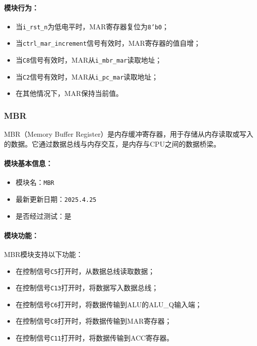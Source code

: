 \documentclass[lang=cn,a4paper,newtx]{elegantpaper}
\begin{document}
\paragraph{模块行为：}
\begin{itemize}
  \item 当\texttt{i\_rst\_n}为低电平时，MAR寄存器复位为\texttt{8'b0}；
  \item 当\texttt{ctrl\_mar\_increment}信号有效时，MAR寄存器的值自增；
  \item 当\texttt{C8}信号有效时，MAR从\texttt{i\_mbr\_mar}读取地址；
  \item 当\texttt{C2}信号有效时，MAR从\texttt{i\_pc\_mar}读取地址；
  \item 在其他情况下，MAR保持当前值。
\end{itemize}
\subsubsection{MBR}
MBR（Memory Buffer Register）是内存缓冲寄存器，用于存储从内存读取或写入的数据。它通过数据总线与内存交互，是内存与CPU之间的数据桥梁。

\paragraph{模块基本信息：}
\begin{itemize}
  \item 模块名：\texttt{MBR}
  \item 最新更新日期：\texttt{2025.4.25}
  \item 是否经过测试：是
\end{itemize}

\paragraph{模块功能：}
MBR模块支持以下功能：
\begin{itemize}
  \item 在控制信号\texttt{C5}打开时，从数据总线读取数据；
  \item 在控制信号\texttt{C13}打开时，将数据写入数据总线；
  \item 在控制信号\texttt{C6}打开时，将数据传输到ALU的ALU\_Q输入端；
  \item 在控制信号\texttt{C8}打开时，将数据传输到MAR寄存器；
  \item 在控制信号\texttt{C11}打开时，将数据传输到ACC寄存器。
\end{itemize}
\end{document}
